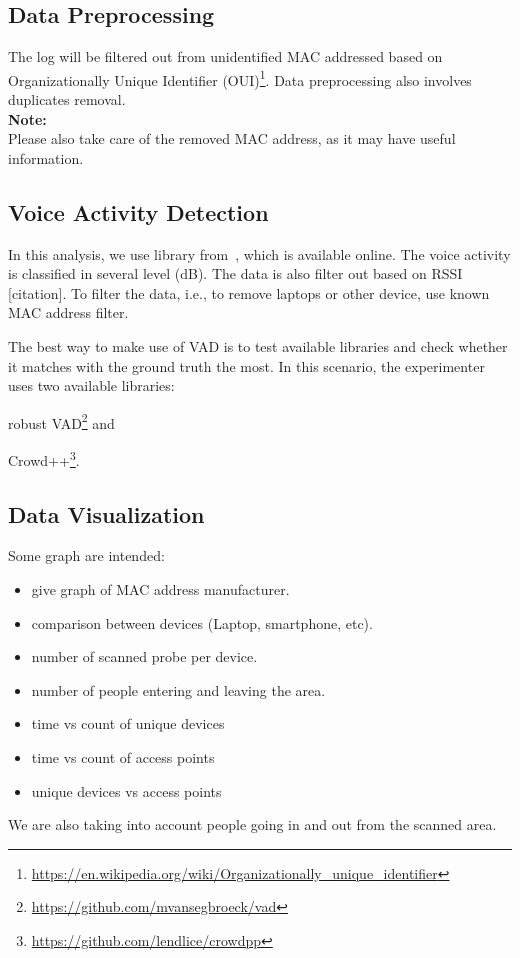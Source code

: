 \documentclass{article}
\begin{document}
\subsection{Data Preprocessing} %
\label{sub:data_preprocessing}
The log will be filtered out from unidentified MAC addressed based on Organizationally Unique Identifier (OUI)\footnote{\url{https://en.wikipedia.org/wiki/Organizationally_unique_identifier}}. Data preprocessing also involves duplicates removal.\\

\noindent
\textbf{Note:}\\
Please also take care of the removed MAC address, as it may have useful information.

\subsection{Voice Activity Detection} %
\label{sub:voice_activity_detection}
In this analysis, we use library from~\cite{thesis070,thesis067}, which is available online. The voice activity is classified in several level (dB). The data is also filter out based on RSSI [citation]. To filter the data, i.e., to remove laptops or other device, use known MAC address filter.

The best way to make use of VAD is to test available libraries and check whether it matches with the ground truth the most. In this scenario, the experimenter uses two available libraries:
	\begin{enumerate*}[label={\alph*)}]
		\item robust VAD\footnote{\url{https://github.com/mvansegbroeck/vad}} and 
		\item Crowd++\footnote{\url{https://github.com/lendlice/crowdpp}}.
	\end{enumerate*}

\subsection{Data Visualization} %
\label{sub:data_visualization}
Some graph are intended:
\begin{itemize}
	\item give graph of MAC address manufacturer.
	\item comparison between devices (Laptop, smartphone, etc).
	\item number of scanned probe per device.
	\item number of people entering and leaving the area.
	\item time vs count of unique devices
	\item time vs count of access points
	\item unique devices vs access points
\end{itemize}
We are also taking into account people going in and out from the scanned area.



{}

\end{document}
